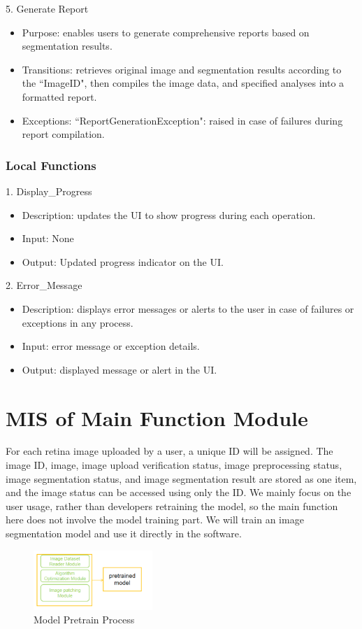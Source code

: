 \documentclass[12pt, titlepage]{article}
\begin{document}
5. Generate Report
\begin{itemize}
    \item Purpose: enables users to generate comprehensive reports based on segmentation results.
    \item Transitions: retrieves original image and segmentation results according to the ``ImageID", then compiles the image data, and specified analyses into a formatted report.  
    \item Exceptions: ``ReportGenerationException": raised in case of failures during report compilation.
\end{itemize}





\subsubsection{Local Functions}
1. Display\_Progress
\begin{itemize}
    \item Description: updates the UI to show progress during each operation.
    \item Input: None 
    \item Output: Updated progress indicator on the UI.
\end{itemize}

2. Error\_Message
\begin{itemize}
    \item Description: displays error messages or alerts to the user in case of failures or exceptions in any process.
    \item Input: error message or exception details. 
    \item Output: displayed message or alert in the UI.
\end{itemize}

\newpage


\section{MIS of Main Function Module} \label{m8} 
For each retina image uploaded by a user, a unique ID will be assigned. The image ID, image, image upload verification status, image preprocessing status, image segmentation status, and image segmentation result are stored as one item, and the image status can be accessed using only the ID. We mainly focus on the user usage, rather than developers retraining the model, so the main function here does not involve the model training part. We will train an image segmentation model and use it directly in the software.
    \begin{figure}[H]
    \centering
    \includegraphics[width=0.4\textwidth]{train.png}
    \caption{Model Pretrain Process}
    \label{Fig4}
    \end{figure}
\end{document}
